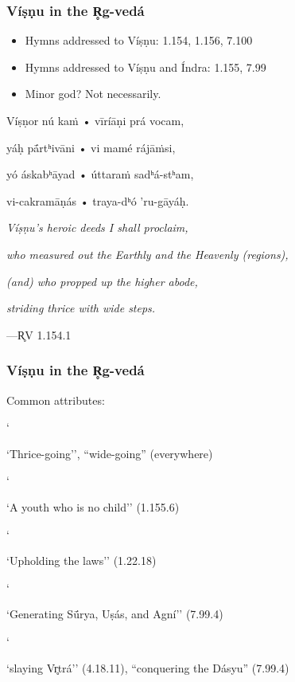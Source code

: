 \documentclass[pdf]{beamer}
\newcommand{\Subitem}[1]{{\setlength\itemindent{12pt} \item[-] #1}}
\begin{document}
\begin{frame} \frametitle{Víṣṇu in the R̥g-vedá}
\begin{itemize}
	\item Hymns addressed to Víṣṇu: 1.154, 1.156, 7.100
	\item Hymns addressed to Víṣṇu and Índra: 1.155, 7.99
	\item Minor god? Not necessarily.
\end{itemize}

\begin{center}
	Víṣṇor nú kaṁ • vīríāṇi prá vocam,

	yáḥ pā́rtʰivāni • vi mamé rájāṁsi,

	yó áskabʰāyad • úttaraṁ sadʰá-stʰam,

	vi-cakramāṇás • traya-dʰó 'ru-gāyáḥ.

	\vspace{\baselineskip}
	
	\textit{Víṣṇu's heroic deeds I shall proclaim,}

	\textit{who measured out the Earthly and the Heavenly (regions),}

	\textit{(and) who propped up the higher abode,}

	\textit{striding thrice with wide steps.}

	\vspace{\baselineskip}

	---R̥V 1.154.1
\end{center}
\end{frame}

\begin{frame} \frametitle{Víṣṇu in the R̥g-vedá}
\begin{itemize}
	\item Common attributes:
	\Subitem ``Thrice-going'', ``wide-going'' (everywhere)
	\Subitem ``A youth who is no child'' (1.155.6)
	\Subitem ``Upholding the laws'' (1.22.18)
	\Subitem ``Generating Sū́rya, Uṣás, and Agní'' (7.99.4)
	\Subitem ``slaying Vr̥trá'' (4.18.11), ``conquering the Dásyu'' (7.99.4)
\end{itemize}
\end{frame}
\end{document}
